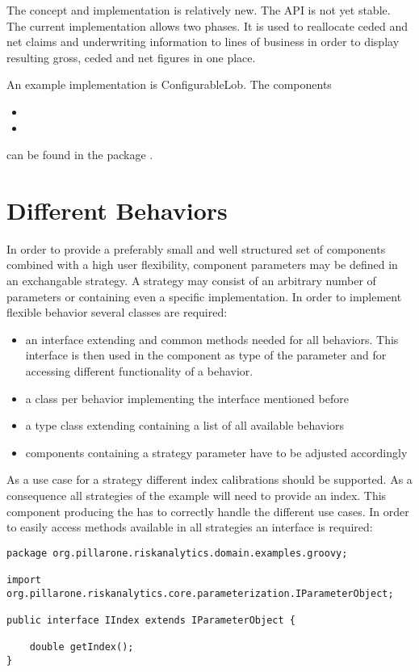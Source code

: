 The concept and implementation is relatively new. The API is not yet stable.
The current implementation allows two phases.
It is used to reallocate ceded and net claims and underwriting information to
lines of business in order to display resulting gross, ceded and net figures in one place.

An example implementation is ConfigurableLob.  The components 
\begin{itemize}
  \item {}
  \item {}
\end{itemize}
can be found in the package .

\section{Different Behaviors}
\label{subsec:diffbehav}

In order to provide a preferably small and well structured set of components combined with a high user flexibility, component parameters may be defined in an exchangable strategy. A strategy may consist of an arbitrary number of parameters or containing even a specific implementation. In order to implement flexible behavior several classes are required:
\begin{itemize}
	\item an interface extending  and common methods needed for all behaviors. This interface is then used in the component as type of the parameter and for accessing different functionality of a behavior.
	\item a class per behavior implementing the interface mentioned before
	\item a type class extending  containing a list of all available behaviors
	\item components containing a strategy parameter have to be adjusted accordingly
\end{itemize}
As a use case for a strategy different index calibrations should be supported. As a consequence all strategies of the example will need to provide an index. This component producing the  has to correctly handle the different use cases. In order to easily access methods available in all strategies an interface is required:
\begin{lstlisting}[label=lst:strategyinterface]
package org.pillarone.riskanalytics.domain.examples.groovy;

import org.pillarone.riskanalytics.core.parameterization.IParameterObject;

public interface IIndex extends IParameterObject {

    double getIndex();
}
\end{lstlisting}

